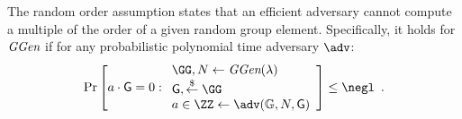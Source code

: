 \begin{assumption}
	The random order assumption states that an efficient adversary cannot compute a multiple of the order of a given random group element. Specifically, it holds for $\textit{GGen}$ if for any probabilistic polynomial time adversary $\adv$:
	\[
    \Pr\left[a\cdot \Generator =0:
    \begin{array}{l}
         \GG, N \leftarrow \ggen(\lambda)  \\
         \Generator, \sample \GG\\
         a \in \ZZ \leftarrow \adv(\mathbb{G},N, \Generator) \\
    \end{array}\right] \leq \negl \enspace .
    \]
\end{assumption}



